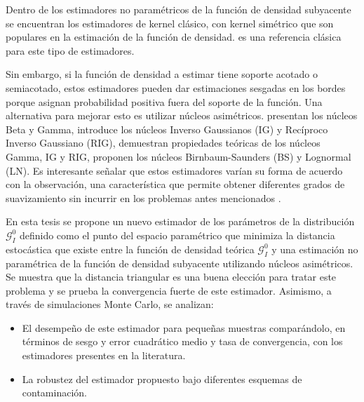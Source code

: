 Dentro de los estimadores no paramétricos de la función de densidad subyacente se encuentran los estimadores de kernel clásico, con kernel simétrico que son populares en la estimación de la función de densidad.  \citet{Silverman1986} es una referencia clásica para este tipo de estimadores.

Sin embargo, si la función de densidad a estimar tiene soporte acotado o semiacotado, estos estimadores pueden dar estimaciones sesgadas en los bordes porque asignan probabilidad positiva fuera del soporte de la función. 
Una alternativa para mejorar esto es utilizar núcleos asimétricos. \citet{chen1999, chensx2000} presentan los núcleos Beta y Gamma, \citet {Scaillet2004} introduce los núcleos Inverso Gaussianos (IG) y Recíproco Inverso Gaussiano (RIG), \citet {bouezmarni2005} demuestran propiedades teóricas de los núcleos Gamma, IG y RIG, \citet{Jin2003}  proponen los núcleos Birnbaum-Saunders (BS) y Lognormal (LN). Es interesante señalar que  estos estimadores varían su forma de acuerdo con la observación, una característica que permite obtener diferentes grados de suavizamiento sin incurrir en los problemas antes mencionados \citep{Scaillet2004}. 

En esta tesis se propone un nuevo  estimador de los parámetros de la distribución $\mathcal{G}_I^0$ definido como el punto del espacio paramétrico que minimiza la distancia estocástica que existe entre la función de densidad teórica $\mathcal{G}_I^0$ y una estimación no paramétrica de la función de densidad subyacente utilizando núcleos asimétricos. Se muestra que la distancia triangular es una buena elección para tratar este problema y se prueba la convergencia fuerte de este estimador. Asimismo, a través de simulaciones Monte Carlo, se analizan:
\begin{itemize}
	\item El desempeño de este estimador para pequeñas muestras comparándolo, en términos de sesgo y error cuadrático medio y tasa de convergencia, con los estimadores presentes en la literatura.
	\item La robustez del estimador propuesto bajo diferentes esquemas de contaminación.
\end{itemize}  

